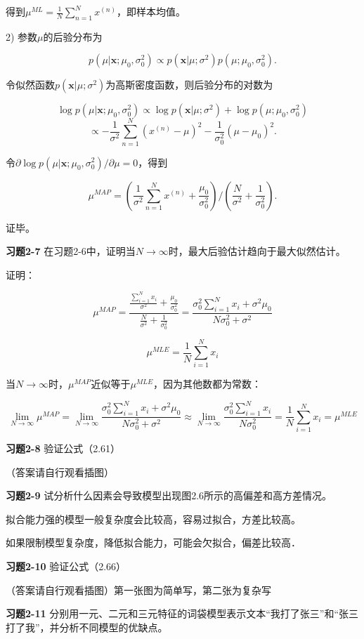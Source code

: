 得到$\mu^{ML}=\frac{1}{N}\sum_{n=1}^N x^{(n)}$，即样本均值。

2) 参数$\mu$的后验分布为

\[p(\mu|\mathbf{x};\mu_0,\sigma_0^2) \propto p(\mathbf{x}|\mu;\sigma^2)p(\mu;\mu_0,\sigma_0^2).\]

令似然函数$p(\mathbf{x}|\mu;\sigma^2)$为高斯密度函数，则后验分布的对数为

\[\log p(\mu|\mathbf{x};\mu_0,\sigma_0^2) \propto \log p(\mathbf{x}|\mu;\sigma^2)+\log p(\mu;\mu_0,\sigma_0^2)\]
\[\propto -\frac{1}{\sigma^2}\sum_{n=1}^N(x^{(n)}-\mu)^2-\frac{1}{\sigma_0^2}(\mu-\mu_0)^2.\]

令$\partial \log p(\mu|\mathbf{x};\mu_0,\sigma_0^2)/\partial \mu=0$，得到

\[\mu^{MAP}=\left(\frac{1}{\sigma^2}\sum_{n=1}^N x^{(n)}+\frac{\mu_0}{\sigma_0^2}\right)/\left(\frac{N}{\sigma^2}+\frac{1}{\sigma_0^2}\right).\]

证毕。

\noindent\textbf{习题2-7} 在习题2-6中，证明当$N \to \infty$时，最大后验估计趋向于最大似然估计。

证明：

\[\mu^{MAP} = \frac{\frac{\sum_{i=1}^N x_i}{\sigma^2} + \frac{\mu_0}{\sigma_0^2}}{\frac{N}{\sigma^2} + \frac{1}{\sigma_0^2}} = \frac{\sigma_0^2\sum_{i=1}^N x_i + \sigma^2\mu_0}{N\sigma_0^2 + \sigma^2}\]

\[\mu^{MLE} = \frac{1}{N}\sum_{i=1}^N x_i\]

当$N \to \infty$时，$\mu^{MAP}$近似等于$\mu^{MLE}$，因为其他数都为常数：

\[\lim_{N\to\infty} \mu^{MAP} = \lim_{N\to\infty} \frac{\sigma_0^2\sum_{i=1}^N x_i + \sigma^2\mu_0}{N\sigma_0^2 + \sigma^2} \approx \lim_{N\to\infty} \frac{\sigma_0^2\sum_{i=1}^N x_i}{N\sigma_0^2} = \frac{1}{N}\sum_{i=1}^N x_i = \mu^{MLE}\]

\noindent\textbf{习题2-8} 验证公式（2.61）

（答案请自行观看插图）

\noindent\textbf{习题2-9} 试分析什么因素会导致模型出现图2.6所示的高偏差和高方差情况。

拟合能力强的模型一般复杂度会比较高，容易过拟合，方差比较高。

如果限制模型复杂度，降低拟合能力，可能会欠拟合，偏差比较高．

\noindent\textbf{习题2-10} 验证公式（2.66）

（答案请自行观看插图）第一张图为简单写，第二张为复杂写

\noindent\textbf{习题2-11} 分别用一元、二元和三元特征的词袋模型表示文本“我打了张三”和“张三打了我”，并分析不同模型的优缺点。

